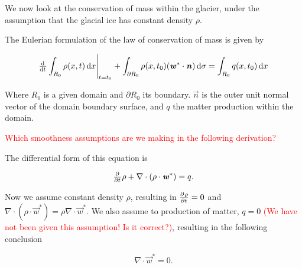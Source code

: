 We now look at the conservation of mass within the glacier, under the assumption that the glacial ice has constant density $\rho$.

The Eulerian formulation of the law of conservation of mass is given by

\begin{equation}
  \eval{\od{}{t} \int_{R_0} \rho(x, t) \dif{x}}_{t = t_0} + \int_{\partial R_0} \rho(x, t_0) (\vec{w}^* \cdot \vec{n}) \dif{\sigma} = \int_{R_0} q(x, t_0) \dif{x}
\end{equation}

Where $R_0$ is a given domain and $\partial R_0$ its boundary. $\vec{n}$ is the outer unit normal vector of the domain boundary surface, and $q$ the matter production within the domain.

\textcolor{red}{Which smoothness assumptions are we making in the following derivation?}

The differential form of this equation is

\begin{equation}
  \pd{}{t} \rho + \nabla \cdot (\rho \cdot \vec{w}^*) = q.
  \label{eq:conservation_of_matter}
\end{equation}

Now we assume constant density $\rho$, resulting in $\pd{\rho}{t} = 0$ and $\nabla \cdot (\rho \cdot \vec{w}^*) = \rho \nabla \cdot \vec{w}^*$. We also assume to production of matter, $q = 0$ \textcolor{red}{(We have not been given this assumption! Is it correct?)}, resulting in the following conclusion

\begin{equation}
  \nabla \cdot \vec{w}^* = 0.
\end{equation}
